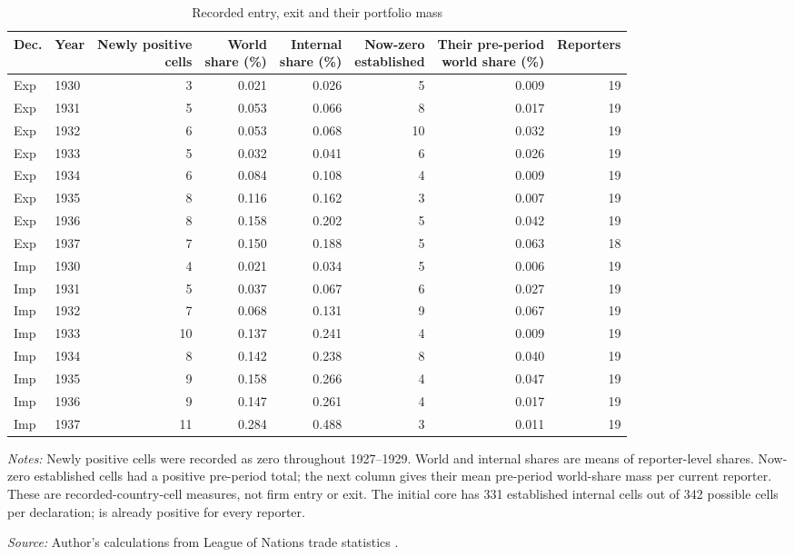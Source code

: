 \begin{table}[!htbp]\centering
\caption{Recorded entry, exit and their portfolio mass}\label{tab:app_newly_positive}
\begin{threeparttable}\footnotesize\setlength{\tabcolsep}{4pt}
\begin{tabular}{@{}llrrrrrr@{}}
\toprule
Dec. & Year & \shortstack{Newly positive\\cells} & \shortstack{World\\share (\%)} & \shortstack{Internal\\share (\%)} & \shortstack{Now-zero\\established} & \shortstack{Their pre-period\\world share (\%)} & Reporters \\
\midrule
Exp & 1930 & 3 & 0.021 & 0.026 & 5 & 0.009 & 19 \\
Exp & 1931 & 5 & 0.053 & 0.066 & 8 & 0.017 & 19 \\
Exp & 1932 & 6 & 0.053 & 0.068 & 10 & 0.032 & 19 \\
Exp & 1933 & 5 & 0.032 & 0.041 & 6 & 0.026 & 19 \\
Exp & 1934 & 6 & 0.084 & 0.108 & 4 & 0.009 & 19 \\
Exp & 1935 & 8 & 0.116 & 0.162 & 3 & 0.007 & 19 \\
Exp & 1936 & 8 & 0.158 & 0.202 & 5 & 0.042 & 19 \\
Exp & 1937 & 7 & 0.150 & 0.188 & 5 & 0.063 & 18 \\
Imp & 1930 & 4 & 0.021 & 0.034 & 5 & 0.006 & 19 \\
Imp & 1931 & 5 & 0.037 & 0.067 & 6 & 0.027 & 19 \\
Imp & 1932 & 7 & 0.068 & 0.131 & 9 & 0.067 & 19 \\
Imp & 1933 & 10 & 0.137 & 0.241 & 4 & 0.009 & 19 \\
Imp & 1934 & 8 & 0.142 & 0.238 & 8 & 0.040 & 19 \\
Imp & 1935 & 9 & 0.158 & 0.266 & 4 & 0.047 & 19 \\
Imp & 1936 & 9 & 0.147 & 0.261 & 4 & 0.017 & 19 \\
Imp & 1937 & 11 & 0.284 & 0.488 & 3 & 0.011 & 19 \\
\bottomrule
\end{tabular}
\begin{tablenotes}[flushleft]\footnotesize\item \textit{Notes:} Newly positive cells were recorded as zero throughout 1927--1929. World and internal shares are means of reporter-level shares. Now-zero established cells had a positive pre-period total; the next column gives their mean pre-period world-share mass per current reporter. These are recorded-country-cell measures, not firm entry or exit. The initial core has 331 established internal cells out of 342 possible cells per declaration; \External{} is already positive for every reporter.
\item \textit{Source:} Author's calculations from League of Nations trade statistics \parencite{league1930,league1936,league1938}.
\end{tablenotes}\end{threeparttable}\end{table}
